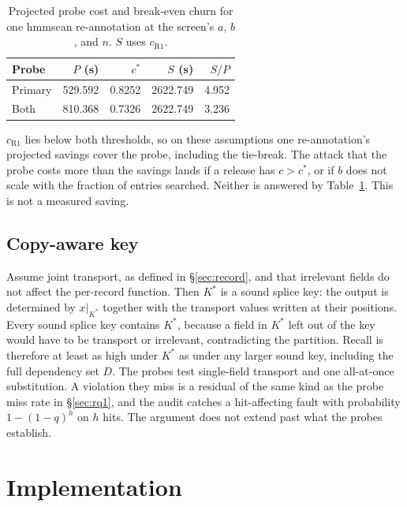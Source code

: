 \documentclass[letterpaper,twocolumn,10pt]{article}
\begin{document}
\begin{table}[t]
\caption{Projected probe cost and break-even churn for one hmmscan re-annotation at the screen's $a$, $b$, and $n$.
$S$ uses $c_{\mathrm{R1}}$.}
\label{tab:breakeven}
\small
\begin{tabular}{@{}lrrrr@{}}
\toprule
Probe & $P$ (s) & $c^{\ast}$ & $S$ (s) & $S/P$ \\
\midrule
Primary & 529.592 & 0.8252 & 2622.749 & 4.952 \\
Both & 810.368 & 0.7326 & 2622.749 & 3.236 \\
\bottomrule
\end{tabular}
\end{table}

$c_{\mathrm{R1}}$ lies below both thresholds, so on these assumptions one re-annotation's projected savings cover the probe, including the tie-break.
The attack that the probe costs more than the savings lands if a release has $c > c^{\ast}$, or if $b$ does not scale with the fraction of entries searched.
Neither is answered by Table~\ref{tab:breakeven}.
This is not a measured saving.

\subsection{Copy-aware key}

Assume joint transport, as defined in \S\ref{sec:record}, and that irrelevant fields do not affect the per-record function.
Then $K^{\ast}$ is a sound splice key: the output is determined by $x|_{K^{\ast}}$ together with the transport values written at their positions.
Every sound splice key contains $K^{\ast}$, because a field in $K^{\ast}$ left out of the key would have to be transport or irrelevant, contradicting the partition.
Recall is therefore at least as high under $K^{\ast}$ as under any larger sound key, including the full dependency set $D$.
The probes test single-field transport and one all-at-once substitution.
A violation they miss is a residual of the same kind as the probe miss rate in \S\ref{sec:rq1}, and the audit catches a hit-affecting fault with probability $1 - (1-q)^{h}$ on $h$ hits.
The argument does not extend past what the probes establish.

\section{Implementation}
\label{sec:impl}
\end{document}
